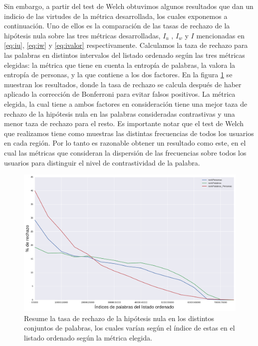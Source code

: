 Sin embargo, a partir del test de Welch obtuvimos algunos resultados que dan un indicio de las virtudes de la métrica desarrollada, los cuales exponemos a continuación. Uno de ellos es la comparación de las tasas de rechazo de la hipótesis nula sobre las tres métricas desarrolladas, $I_u$ , $I_w$ y $I$ mencionadas en \ref{eq:iu}, \ref{eq:iw} y \ref{eq:ivalor} respectivamente.
Calculamos la taza de rechazo para las palabras en distintos intervalos del listado ordenado según las tres métricas elegidas: la métrica que tiene en cuenta la entropía de palabras, la valora la entropía de personas, y la que contiene a los dos factores. En la figura \ref{fig:rechazo_metricas} se muestran los resultados, donde la tasa de rechazo se calcula después de haber aplicado la corrección de Bonferroni para evitar falsos positivos. La métrica elegida, la cual tiene a ambos factores en consideración tiene una mejor taza de rechazo de la hipótesis nula en las palabras consideradas contrastivas y una menor taza de rechazo para el resto. 
Es importante notar que el test de Welch que realizamos tiene como muestras las distintas frecuencias de todos los usuarios en cada región. Por lo tanto es razonable obtener un resultado como este, en el cual las métricas que consideran la dispersión de las frecuencias sobre todos los usuarios para distinguir el nivel de contrastividad de la palabra.

\begin{figure}[!ht]\centering
  
    \includegraphics[width=\linewidth]{./images/rechazo_metricas.pdf}
    \caption{Resume la tasa de rechazo de la hipótesis nula en los distintos conjuntos de palabras, los cuales varían según el índice de estas en el listado ordenado según la métrica elegida.} 
    \label{fig:rechazo_metricas} 

\end{figure}

